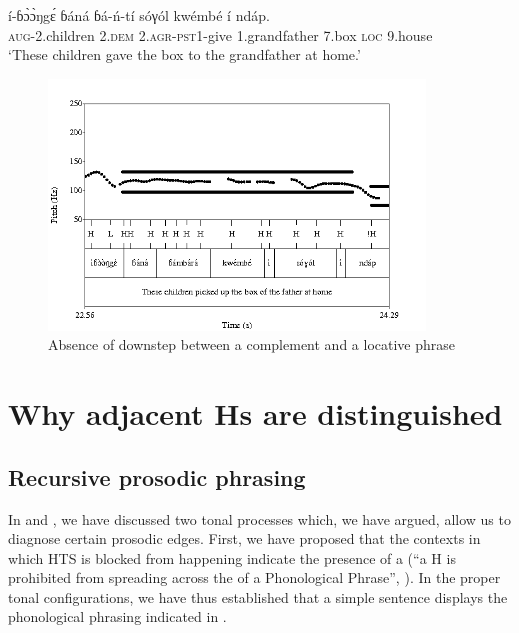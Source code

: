 \documentclass[output=paper,newtxmath,modfonts,nonflat,hidelinks]{langsci/langscibook}
\begin{document}
\ea \gll í-ɓ\`ɔ\`ɔŋg\'ɛ ɓ{á}n{á} ɓ{á}-ń-tí sóγól {\textdownstep}kwémbé í {\textdownstep}nd{á}p.\\
\textsc{aug}-2.children 2.\textsc{dem} 2.\textsc{agr}-\textsc{pst1}-give 1.grandfather 7.box \textsc{loc} 9.house\\
\glt `These children gave the box to the grandfather at home.'\label{ex:HamlaouiMakasso:16}
\z


\begin{figure}

\caption{Absence of downstep between a complement and a locative phrase  \label{fig:HamlaouiMakasso:6}}
\includegraphics[width=10cm]{figures/LocSept16B}

\end{figure}


\section{Why adjacent Hs are distinguished}\label{sec:HamlaouiMakasso:4} 

\subsection{Recursive prosodic phrasing}

In \citet{HamlaouiEtAl14} and \citet{HamlaouiSzendroi15, HamlaouiSzendroi16}, we have discussed two tonal processes which, we have argued, allow us to diagnose certain prosodic edges. First, we have proposed that the contexts in which HTS is blocked from happening indicate the presence of a   (``a H  is prohibited from spreading across the  of a Phonological Phrase'', \citealt[27]{HamlaouiEtAl14}). In the proper tonal configurations, we have thus established that a simple sentence displays the phonological phrasing indicated in .
\end{document}
